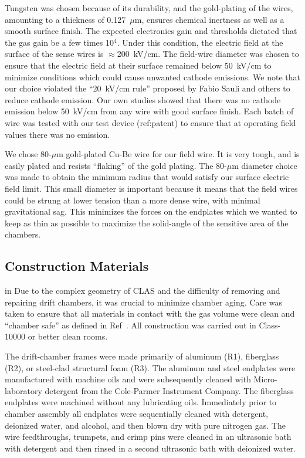 Tungsten was chosen because of its durability, 
and the gold-plating of the wires, amounting to a thickness of 0.127~$\mu$m, 
ensures chemical inertness as well as a smooth surface finish.  The expected 
electronics gain and thresholds dictated that the gas gain be a few times 
10$^4$.  Under this condition, the electric field at the surface of the sense 
wires is $\approx$200~kV/cm.  The field-wire diameter was chosen to ensure 
that the electric field at their surface remained below 50~kV/cm to minimize 
conditions which could cause unwanted cathode emissions.  We note that
our choice violated the ``20~kV/cm rule'' proposed by Fabio Sauli and others
to reduce cathode emission.  Our own studies showed that there was no cathode
emission below 50~kV/cm from any wire with good surface finish.  Each batch
of wire was tested with our test device (ref:patent) to ensure that at operating field 
values there was no emission.  

We chose 80-$\mu$m gold-plated Cu-Be wire for our field wire.
It is very tough, and is easily plated and resists ``flaking'' of the gold
plating.  The 80-$\mu$m diameter choice was made to obtain the minimum
radius that would satisfy our surface electric field limit.  This small
diameter is important because it means that the field wires could be strung 
at lower tension than a more dense wire, with minimal gravitational sag.  
This minimizes the forces on the endplates which we wanted to keep as 
thin as possible to maximize the solid-angle of the sensitive area of
the chambers.


\subsection{Construction Materials}

 in
Due to the complex geometry of CLAS and the difficulty of removing and repairing 
drift chambers, it was crucial to minimize chamber aging.  Care was taken to 
ensure that all materials in contact with the gas volume were clean and ``chamber 
safe'' as defined in Ref~\cite{kadyk}.  All construction was carried out in 
Class-10000 or better clean rooms.

The drift-chamber frames were made primarily of aluminum (R1), fiberglass (R2),
or steel-clad structural foam (R3).  The aluminum and steel endplates were 
manufactured with machine oils and were subsequently cleaned with  
Micro-laboratory detergent from the Cole-Parmer Instrument Company.  The 
fiberglass endplates were machined without any lubricating oils.  Immediately 
prior to chamber assembly all endplates were sequentially cleaned with 
detergent,
 deionized water, and alcohol, and then blown dry with pure nitrogen gas.  The 
wire feedthroughs, trumpets, and crimp pins were cleaned in an ultrasonic bath 
with detergent and then rinsed in a second ultrasonic bath with deionized water.

